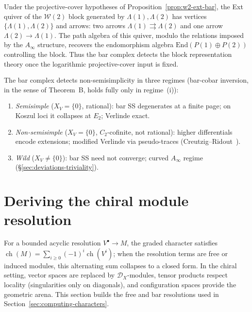 \begin{remark}
\label{rem:w2-ext-quiver}
Under the projective-cover hypotheses of Proposition~\ref{prop:w2-ext-bar},
the Ext quiver of the $\mathcal{W}(2)$ block generated by
$\Lambda(1),\Lambda(2)$ has vertices
$\{\Lambda(1), \Lambda(2)\}$ and arrows:
two arrows $\Lambda(1) \rightrightarrows \Lambda(2)$ and one
arrow $\Lambda(2) \to \Lambda(1)$. The path algebra of this
quiver, modulo the relations imposed by the $A_\infty$ structure,
recovers the endomorphism algebra $\mathrm{End}(P(1) \oplus P(2))$
controlling the block. Thus the bar complex detects the block
representation theory once the logarithmic projective-cover input is
fixed.
\end{remark}

\begin{remark}
\label{rem:non-semisimple-tensor}
The bar complex detects non-semisimplicity in three regimes
(bar-cobar inversion, in the sense of Theorem~B, holds fully only
in regime~(i)):
\begin{enumerate}[label=\textup{(\roman*)}]
\item \emph{Semisimple} ($X_V = \{0\}$, rational): bar SS
 degenerates at a finite page; on Koszul loci it collapses at
 $E_2$; Verlinde exact.
\item \emph{Non-semisimple} ($X_V = \{0\}$, $C_2$-cofinite, not rational): higher differentials encode extensions; modified Verlinde via pseudo-traces (Creutzig--Ridout~\cite{CreutzigRidout2013}).
\item \emph{Wild} ($X_V \neq \{0\}$): bar SS need not converge; curved $A_\infty$ regime (\S\ref{sec:deviations-triviality}).
\end{enumerate}
\end{remark}

\section{Deriving the chiral module resolution}\label{sec:chiral-module-resolution}

For a bounded acyclic resolution $V^\bullet \to M$, the graded
character satisfies
$\operatorname{ch}(M) = \sum_{i \geq 0} (-1)^i \operatorname{ch}(V^i)$;
when the resolution terms are free or induced modules, this
alternating sum collapses to a closed form. In the chiral setting,
vector spaces are replaced by $\mathcal{D}_X$-modules, tensor
products respect locality (singularities only on diagonals), and
configuration spaces provide the geometric arena. This section builds
the free and bar resolutions used in
Section~\ref{sec:computing-characters}.


